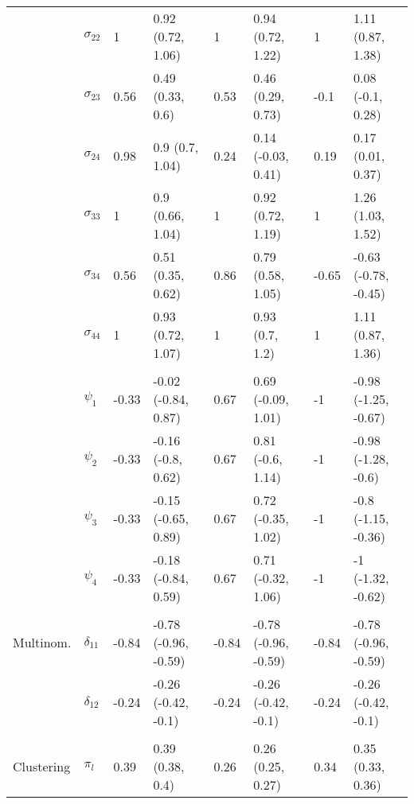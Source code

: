\documentclass[]{article}
\begin{document}
\begin{table}[t]
\begin{tabular}{llllllll}
\hspace{1em} & $\sigma_{22}$ & 1 & 0.92 (0.72, 1.06) & 1 & 0.94 (0.72, 1.22) & 1 & 1.11 (0.87, 1.38)\\
\hspace{1em} & $\sigma_{23}$ & 0.56 & 0.49 (0.33, 0.6) & 0.53 & 0.46 (0.29, 0.73) & -0.1 & 0.08 (-0.1, 0.28)\\
\hspace{1em} & $\sigma_{24}$ & 0.98 & 0.9 (0.7, 1.04) & 0.24 & 0.14 (-0.03, 0.41) & 0.19 & 0.17 (0.01, 0.37)\\
\hspace{1em} & $\sigma_{33}$ & 1 & 0.9 (0.66, 1.04) & 1 & 0.92 (0.72, 1.19) & 1 & 1.26 (1.03, 1.52)\\
\hspace{1em} & $\sigma_{34}$ & 0.56 & 0.51 (0.35, 0.62) & 0.86 & 0.79 (0.58, 1.05) & -0.65 & -0.63 (-0.78, -0.45)\\
\hspace{1em} & $\sigma_{44}$ & 1 & 0.93 (0.72, 1.07) & 1 & 0.93 (0.7, 1.2) & 1 & 1.11 (0.87, 1.36)\\
\addlinespace[0.3em]
\multicolumn{8}{l}{\textbf{ }}\\
\hspace{1em} & $\psi_{1}$ & -0.33 & -0.02 (-0.84, 0.87) & 0.67 & 0.69 (-0.09, 1.01) & -1 & -0.98 (-1.25, -0.67)\\
\hspace{1em} & $\psi_{2}$ & -0.33 & -0.16 (-0.8, 0.62) & 0.67 & 0.81 (-0.6, 1.14) & -1 & -0.98 (-1.28, -0.6)\\
\hspace{1em} & $\psi_{3}$ & -0.33 & -0.15 (-0.65, 0.89) & 0.67 & 0.72 (-0.35, 1.02) & -1 & -0.8 (-1.15, -0.36)\\
\hspace{1em} & $\psi_{4}$ & -0.33 & -0.18 (-0.84, 0.59) & 0.67 & 0.71 (-0.32, 1.06) & -1 & -1 (-1.32, -0.62)\\
\addlinespace[0.3em]
\multicolumn{8}{l}{\textbf{ }}\\
\hspace{1em}Multinom. & $\delta_{11}$ & -0.84 & -0.78 (-0.96, -0.59) & -0.84 & -0.78 (-0.96, -0.59) & -0.84 & -0.78 (-0.96, -0.59)\\
\hspace{1em} & $\delta_{12}$ & -0.24 & -0.26 (-0.42, -0.1) & -0.24 & -0.26 (-0.42, -0.1) & -0.24 & -0.26 (-0.42, -0.1)\\
\addlinespace[0.3em]
\multicolumn{8}{l}{\textbf{ }}\\
\hspace{1em}Clustering & $\pi_l$ & 0.39 & 0.39 (0.38, 0.4) & 0.26 & 0.26 (0.25, 0.27) & 0.34 & 0.35 (0.33, 0.36)\\
\bottomrule
\end{tabular}
\end{table}
\end{document}
